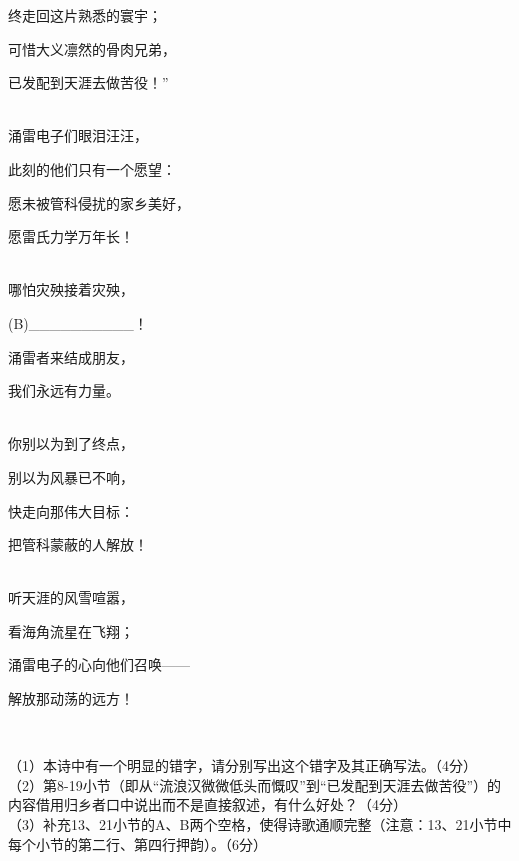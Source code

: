 \documentclass[UTF8,12pt,oneside]{ctexbook}
\begin{document}
\begin{center}
        终走回这片熟悉的寰宇；
        
        可惜大义凛然的骨肉兄弟，
        
        已发配到天涯去做苦役！”
      
        ~\\
      
        涌雷电子们眼泪汪汪，
        
        此刻的他们只有一个愿望：
        
        愿未被管科侵扰的家乡美好，
        
        愿雷氏力学万年长！
      
        ~\\
        
        哪怕灾殃接着灾殃，
        
        (B)\_\_\_\_\_\_\_\_\_\_！
        
        涌雷者来结成朋友，
        
        我们永远有力量。
      
        ~\\
        
        你别以为到了终点，
        
        别以为风暴已不响，
        
        快走向那伟大目标：
        
        把管科蒙蔽的人解放！
      
        ~\\
        
        听天涯的风雪喧嚣，
        
        看海角流星在飞翔；
        
        涌雷电子的心向他们召唤——
        
        解放那动荡的远方！
      
        ~\\
        
    \end{center}
    \songti
    
    （1）本诗中有一个明显的错字，请分别写出这个错字及其正确写法。（4分）
    ~\\
    
    （2）第8-19小节（即从“流浪汉微微低头而慨叹”到“已发配到天涯去做苦役”）的内容借用归乡者口中说出而不是直接叙述，有什么好处？（4分）
    ~\\
    
    （3）补充13、21小节的A、B两个空格，使得诗歌通顺完整（注意：13、21小节中每个小节的第二行、第四行押韵）。（6分）
    
\end{document}
